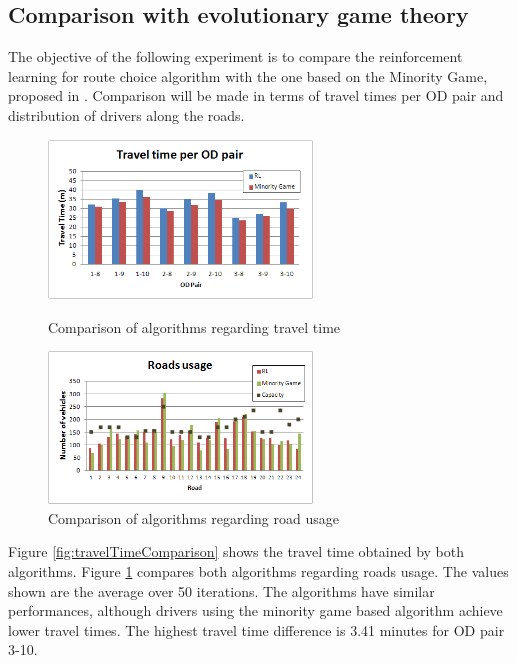 \documentclass[12pt]{article}
\begin{document}
\subsection{Comparison with evolutionary game theory}

The objective of the following experiment is to compare the reinforcement learning for route choice algorithm with the one based on the Minority Game, proposed in \cite{Galib&Moser2011}. Comparison will be made in terms of travel times per OD pair and distribution of drivers along the roads. 

\begin{figure}[ht]
    \centerline{\includegraphics[width=7cm]{img/rl_vs_mg_traveltime.png}}
    \caption{Comparison of algorithms regarding travel time}
    \label{fig:travelTimeComparison}
\vspace*{3ex} \centering
    \centerline{\includegraphics[width=7cm]{img/roadsUsage_comparison.png}}
    \caption{Comparison of algorithms regarding road usage}
    \label{fig:roadsUsageComparison}
\end{figure}

Figure \ref{fig:travelTimeComparison} shows the travel time obtained by both algorithms. Figure \ref{fig:roadsUsageComparison} compares both algorithms regarding roads usage. The values shown are the average over 50 iterations. The algorithms have similar performances, although drivers using the minority game based algorithm achieve lower travel times. The highest travel time difference is 3.41 minutes for OD pair 3-10.
\end{document}
